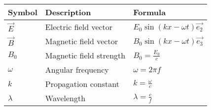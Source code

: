 \setlength{\arrayrulewidth}{0.3mm}
\setlength{\tabcolsep}{15pt}
\renewcommand{\arraystretch}{1.5}

\begin{center}
\begin{tabular}{ |p{1cm}|p{1.5cm}|p{2.3cm}|  }
\hline

Symbol& Description&Formula\\
\hline
$\vec{E}$ & Electric field vector & $E_0\sin(kx - \omega t)\vec{e_2}$\\
\hline
$\vec{B}$ & Magnetic field vector & $B_0\sin(kx - \omega t)\vec{e_3}$\\
\hline
$B_0$ & Magnetic field strength & $B_0 = \frac{E_0}{c}$\\
\hline
$\omega$ & Angular frequency & $\omega = 2\pi f$\\
\hline
$k$ &Propagation constant & $k = \frac{\omega}{c}$\\
\hline
$\lambda$ & Wavelength & $\lambda = \frac{c}{f}$\\
\hline

\end{tabular}
\end{center}